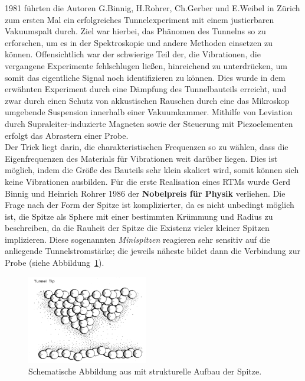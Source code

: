 1981 führten die Autoren G.Binnig, H.Rohrer,
Ch.Gerber und E.Weibel in Zürich zum ersten Mal ein erfolgreiches
Tunnelexperiment \cite{binnig1982tunneling} 
mit einem justierbaren Vakuumspalt durch. 
Ziel war hierbei, das Phänomen des Tunnelns so zu erforschen,
um es in der Spektroskopie und andere Methoden einsetzen zu können. 
Offensichtlich war der schwierige Teil der, die Vibrationen,
die vergangene Experimente fehlschlugen ließen, hinreichend zu
unterdrücken, um somit das eigentliche Signal noch identifizieren zu
können. Dies wurde in dem erwähnten Experiment durch eine 
Dämpfung des Tunnelbauteils erreicht, und zwar durch einen Schutz
von akkustischen Rauschen durch eine das Mikroskop umgebende 
Suspension innerhalb einer Vakuumkammer. 
Mithilfe von Leviation durch Supraleiter-induzierte Magneten sowie
der Steuerung mit Piezoelementen erfolgt das Abrastern einer
Probe. \\ Der Trick liegt darin,
die charakteristischen Frequenzen so zu wählen, dass die 
Eigenfrequenzen des Materials für Vibrationen weit darüber liegen.
Dies ist möglich, indem die Größe des Bauteils sehr klein
skaliert wird, somit können sich keine Vibrationen ausbilden.
Für die erste Realisation eines RTMs  
wurde Gerd Binnig und Heinrich Rohrer 1986 der \textbf{Nobelpreis
für Physik} verliehen. 
Die Frage nach der Form der Spitze ist komplizierter, da es 
nicht unbedingt möglich ist, die Spitze als Sphere mit einer
bestimmten Krümmung und Radius zu beschreiben, da die Rauheit der
Spitze die Existenz vieler kleiner Spitzen implizieren. Diese
sogenannten \textit{Minispitzen} reagieren sehr sensitiv auf die anliegende
Tunnelstromstärke; die jeweils näheste bildet dann die Verbindung
zur Probe (siehe Abbildung~\ref{fig:multitip}).\\ 
\begin{figure}
  \begin{center}
    \includegraphics[width=0.47\textwidth]{pics/multitip}
  \end{center}
\caption{Schematische Abbildung aus \cite{binnig1987scanning}
mit strukturelle Aufbau der Spitze.} 
  \vspace{+20pt}
 \label{fig:multitip}

\end{figure}
